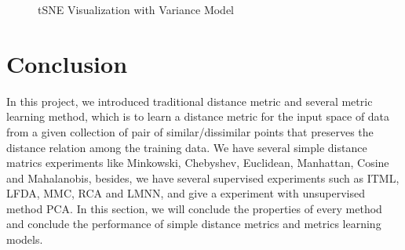 \documentclass[conference]{IEEEtran}
\begin{document}
\begin{center}
\begin{figure}
\centering
{}
\quad
{}
\quad
{}
\quad
{}
\caption{tSNE Visualization with Variance Model}
\label{Fig2}
\end{figure}
\end{center}

\section{Conclusion}

In this project, we introduced traditional distance metric and several metric learning method, which is to learn a distance metric for the input space of data from a given collection of pair of similar/dissimilar points that preserves the distance relation among the training data. We have several simple distance matrics experiments like Minkowski, Chebyshev, Euclidean, Manhattan, Cosine and Mahalanobis, besides, we have several supervised experiments such as ITML, LFDA, MMC, RCA and LMNN, and give a experiment with unsupervised method PCA. In this section, we will conclude the properties of every method and conclude the performance of simple distance metrics and metrics learning models.
\end{document}
